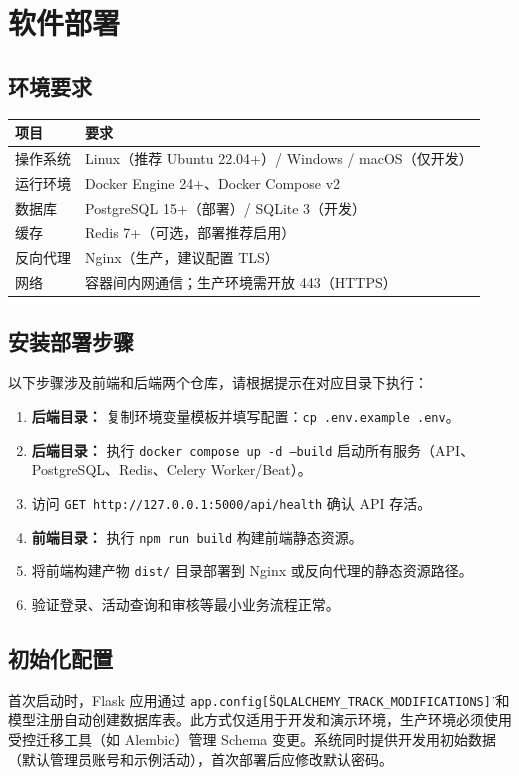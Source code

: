 \documentclass[12pt,a4paper]{ctexart}
\begin{document}
\section{软件部署}
\subsection{环境要求}
\noindent\begin{tabularx}{\textwidth}{p{2.5cm}Y}
\toprule 项目 & 要求 \\\midrule
操作系统 & Linux（推荐 Ubuntu 22.04+）/ Windows / macOS（仅开发） \\
运行环境 & Docker Engine 24+、Docker Compose v2 \\
数据库 & PostgreSQL 15+（部署）/ SQLite 3（开发） \\
缓存 & Redis 7+（可选，部署推荐启用） \\
反向代理 & Nginx（生产，建议配置 TLS） \\
网络 & 容器间内网通信；生产环境需开放 443（HTTPS） \\
\bottomrule
\end{tabularx}

\subsection{安装部署步骤}
以下步骤涉及前端和后端两个仓库，请根据提示在对应目录下执行：
\begin{enumerate}
\item \textbf{后端目录：} 复制环境变量模板并填写配置：\texttt{cp .env.example .env}。
\item \textbf{后端目录：} 执行 \texttt{docker compose up -d --build} 启动所有服务（API、PostgreSQL、Redis、Celery Worker/Beat）。
\item 访问 \texttt{GET http://127.0.0.1:5000/api/health} 确认 API 存活。
\item \textbf{前端目录：} 执行 \texttt{npm run build} 构建前端静态资源。
\item 将前端构建产物 \texttt{dist/} 目录部署到 Nginx 或反向代理的静态资源路径。
\item 验证登录、活动查询和审核等最小业务流程正常。
\end{enumerate}

\subsection{初始化配置}
首次启动时，Flask 应用通过 \texttt{app.config[\"SQLALCHEMY\_TRACK\_MODIFICATIONS\"]} 和模型注册自动创建数据库表。此方式仅适用于开发和演示环境，生产环境必须使用受控迁移工具（如 Alembic）管理 Schema 变更。系统同时提供开发用初始数据（默认管理员账号和示例活动），首次部署后应修改默认密码。
\end{document}
